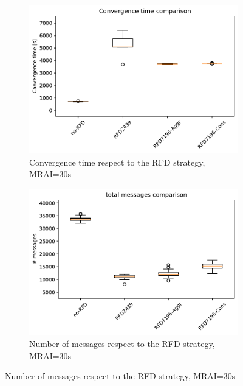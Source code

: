 \begin{figure}[H]
\begin{subfigure}[b]{0.325\textwidth}
         \label{fig:1000_RFD_MRAI30_suppressions_elephant}
     \end{subfigure}
     \vfill
     \begin{subfigure}[b]{0.325\textwidth}
         \centering
         \includegraphics[width=\textwidth]{images/RFD/miceVSelephants/MultiMRAI/30/elephants/cisco_1000MRAI30_rfd_comparison_time_boxplot.pdf}
         \caption{Convergence time respect to the RFD strategy, MRAI=30s}
         \label{fig:1000_RFD_MRAI30_time_elephant}
     \end{subfigure}
     \hfill
     \begin{subfigure}[b]{0.325\textwidth}
         \centering
         \includegraphics[width=\textwidth]{images/RFD/miceVSelephants/MultiMRAI/30/elephants/cisco_1000MRAI30_rfd_comparison_messages_boxplot.pdf}
         \caption{Number of messages respect to the RFD strategy, MRAI=30s}

\end{subfigure}
\end{figure}
